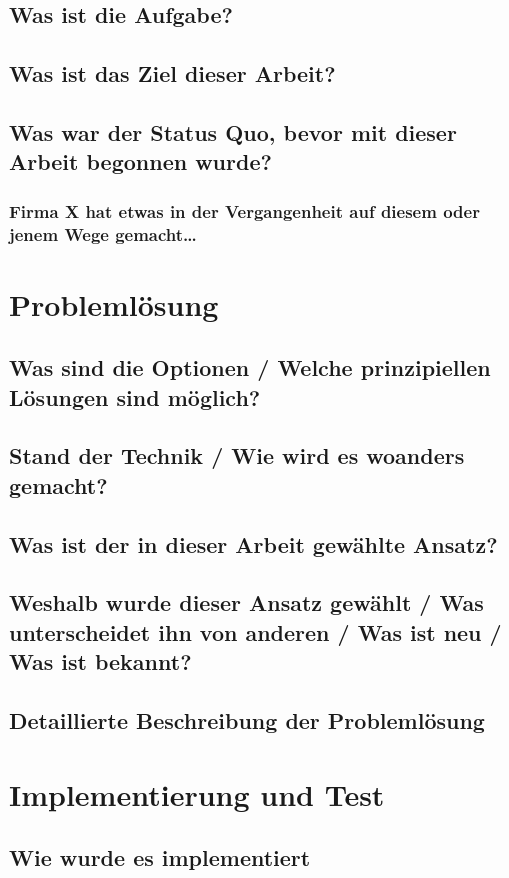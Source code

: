 \documentclass[a4paper,12pt]{article}
\begin{document}
\subsection{Was ist die Aufgabe?}
\blindtext
\subsection{Was ist das Ziel dieser Arbeit?}
\blindtext
\subsection{Was war der Status Quo, bevor mit dieser Arbeit begonnen wurde?}
\blindtext
\subsubsection{Firma X hat etwas in der Vergangenheit auf diesem oder jenem Wege gemacht…}
\blindtext
\section{Problemlösung}
\blindtext
\subsection{Was sind die Optionen / Welche prinzipiellen Lösungen sind möglich?}
\blindtext
\subsection{Stand der Technik / Wie wird es woanders gemacht?}
\blindtext
\subsection{Was ist der in dieser Arbeit gewählte Ansatz?}
\blindtext
\subsection{Weshalb wurde dieser Ansatz gewählt / Was unterscheidet ihn von anderen / Was ist neu / Was ist bekannt?}
\blindtext
\subsection{Detaillierte Beschreibung der Problemlösung}
\blindtext
\section{Implementierung und Test}
\blindtext
\subsection{Wie wurde es implementiert}
\blindtext
\end{document}

